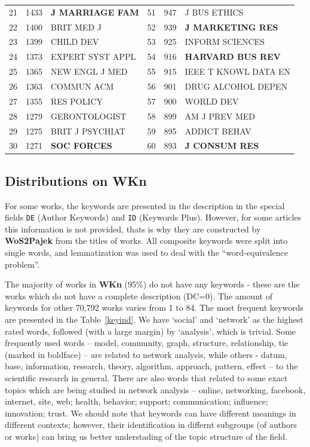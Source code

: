 \documentclass[11pt]{article} %
\newcommand{\Remark}[1]{\ifodd\value{page} \normalmarginpar
 \else \reversemarginpar \fi \marginpar{{\footnotesize #1}} }
\begin{document}
\begin{table}
\begin{tabular}{c|r|l||c|r|l}
21&   	1433&   	\textbf{J MARRIAGE FAM}&   	51&   	947&   	J BUS ETHICS\\   
22&   	1400&   	BRIT MED J&   	52&   	939&   	\textbf{J MARKETING RES}\\   
23&   	1399&   	CHILD DEV&   	53&   	925&   	INFORM SCIENCES\\   
24&   	1373&   	EXPERT SYST APPL&   	54&   	916&   	\textbf{HARVARD BUS REV}\\   
25&   	1365&   	NEW ENGL J MED&   	55&   	915&   	IEEE T KNOWL DATA EN\\   
26&   	1363&   	COMMUN ACM&   	56&   	901&   	DRUG ALCOHOL DEPEN\\   
27&   	1355&   	RES POLICY&   	57&   	900&   	WORLD DEV\\   
28&   	1279&   	GERONTOLOGIST&   	58&   	899&   	AM J PREV MED\\   
29&   	1275&   	BRIT J PSYCHIAT&   	59&   	895&   	ADDICT BEHAV\\   
30&   	1271&   	\textbf{SOC FORCES}&   	60&   	893&   	\textbf{J CONSUM RES}\\  \hline
\end{tabular}

	

\end{table}

\subsection{Distributions on WKn}

For some works, the keywords are presented in the description in the special fields \texttt {DE} (Author Keywords) and \texttt {ID} (Keywords Plus). However, for some articles this information is not provided, thats is why they are constructed by \textbf{WoS2Pajek} from the titles of works. All composite keywords were split into single words, and lemmatization was used to deal with the ``word-equivalence problem''. \medskip

The majority of works in \textbf{WKn} (95\%) do not have any keywords - these are the works which do not have a complete description (DC=0). The amount of keywords for other 70,792 works varies from 1 to 84. \Remark{ Idea: loolk at moda, or average?} The most frequent keywords are presented in the Table~\ref{keyind}. We have `social' and `network' as the highest rated words, followed (with a large margin) by `analysis', which is trivial. Some frequently used words -- model, community, graph, structure, relationship, tie (marked in boldface) -- are related to network analysis, while others - datum, base, information, research, theory, algorithm, approach, pattern, effect -- to the scientific research in general. There are also words that related to some exact topics which are being studied in network analysis -- online,  networking, facebook, internet, site, web; health, behavior; support; communication; influence; innovation; trust. We should note that keywords can have different meanings in different contexts; however, their identification in differnt subgroups (of authors or works) can bring us better understading of the topic structure of the field. \medskip
\end{document}
